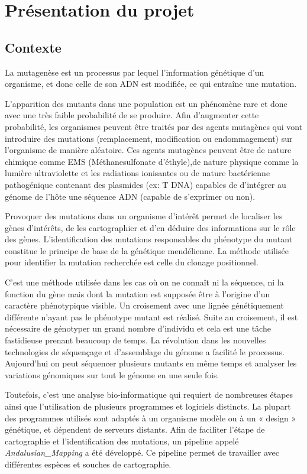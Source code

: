 \documentclass[12pt]{article}
\begin{document}
\newpage

\section{Présentation du projet}
\subsection{Contexte}

La mutagenèse est un processus par lequel l'information génétique d'un organisme, et donc celle de son ADN est modifiée, ce qui entraîne une mutation.

L'apparition des mutants dans une population est un phénomène rare et donc avec une très faible probabilité de se produire. Afin d'augmenter cette probabilité, les organismes peuvent être traités par des agents mutagènes qui vont introduire des mutations (remplacement, modification ou endommagement) sur l'organisme de manière aléatoire. Ces agents mutagènes peuvent être de nature chimique comme EMS (Méthanesulfonate d'éthyle),de nature physique comme la lumière ultraviolette et les radiations ionisantes ou de nature bactérienne pathogénique contenant des plasmides (ex: T DNA) capables de d’intégrer au génome de l'hôte une séquence ADN (capable de s'exprimer ou non). 

Provoquer des mutations dans un organisme d’intérêt permet de localiser les gènes d’intérêts, de les cartographier et d'en déduire des informations sur le rôle des gènes. L'identification des mutations responsables du phénotype du mutant constitue le principe de base de la génétique mendélienne. La méthode utilisée pour identifier la mutation recherchée est celle du clonage positionnel.

C'est une méthode utilisée dans les cas où on ne connaît ni la séquence, ni la fonction du gène mais dont la mutation est supposée être à l'origine d'un caractère phénotypique visible. Un croisement avec une lignée génétiquement différente n'ayant pas le phénotype mutant est réalisé. Suite au croisement, il est nécessaire de génotyper un grand nombre d'individu et cela est une tâche fastidieuse prenant beaucoup de temps. La révolution dans les nouvelles technologies de séquençage et d'assemblage du génome a facilité le processus. Aujourd'hui on peut séquencer plusieurs mutants en même temps et analyser les variations génomiques sur tout le génome en une seule fois.

Toutefois, c'est une analyse bio-informatique qui requiert de nombreuses étapes ainsi que l'utilisation de plusieurs programmes et logiciels distincts. La plupart des programmes utilisés sont adaptés à un organisme modèle ou à un « design » génétique, et dépendent de serveurs distants. Afin de faciliter l'étape de cartographie et l'identification des mutations, un pipeline appelé \textit{Andalusian\_Mapping} a été développé. Ce pipeline permet de travailler avec différentes espèces et souches de cartographie.
\end{document}
